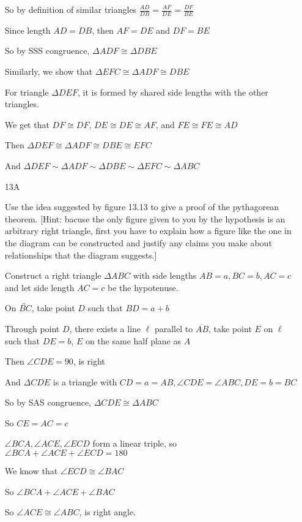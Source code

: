 \documentclass[11pt]{article}
\newcommand{\lines}[1]{\overleftrightarrow{#1}}
\newcommand{\segment}[1]{\overline{#1}}
\begin{document}
\begin{itemize}
		So by definition of similar triangles $\frac{AD}{DB} = \frac{AF}{DE} = \frac{DF}{BE}$

		Since length $AD = DB$, then $AF = DE$ and $DF = BE$

		So by SSS congruence, $\Delta ADF \cong \Delta DBE$

		Similarly, we show that $\Delta EFC \cong \Delta ADF \cong DBE$

		For triangle $\Delta DEF$, it is formed by shared side lengths with the other triangles.

		We get that $DF \cong DF$, $DE \cong DE \cong AF$, and $FE \cong FE \cong AD$

		Then $\Delta DEF \cong \Delta ADF \cong DBE \cong EFC$

		And $\Delta DEF \sim \Delta ADF \sim \Delta DBE \sim \Delta EFC \sim \Delta ABC$

	\item[13A]

		Use the idea suggested by figure 13.13 to give a proof of the pythagorean theorem. [Hint: bacuse the only figure given to you by the hypothesis is an arbitrary right triangle, first you have to explain how a figure like the one in the diagram can be constructed and justify any claims you make about relationships that the diagram suggests.] 

		Construct a right triangle $\Delta ABC$ with side lengths $AB = a, BC = b, AC = c$ and let side length $AC = c$ be the hypotenuse.

		On $\lines{BC}$, take point $D$ such that $BD = a + b$

		Through point $D$, there exists a line $\ell$ parallel to $\segment{AB}$, take point $E$ on $\ell$ such that $DE = b$, $E$ on the same half plane as $A$

		Then $\angle CDE = 90$, is right

		And $\Delta CDE$ is a triangle with $CD = a = AB, \angle CDE = \angle ABC, DE = b = BC$

		So by SAS congruence, $\Delta CDE \cong \Delta ABC$

		So $CE = AC = c$

		$\angle BCA, \angle ACE, \angle ECD$ form a linear triple, so $\angle BCA + \angle ACE + \angle ECD = 180$

		We know that $\angle ECD \cong \angle BAC$

		So $\angle BCA + \angle ACE + \angle BAC$

		So $\angle ACE \cong \angle ABC$, is right angle.


\end{itemize}
\end{document}
